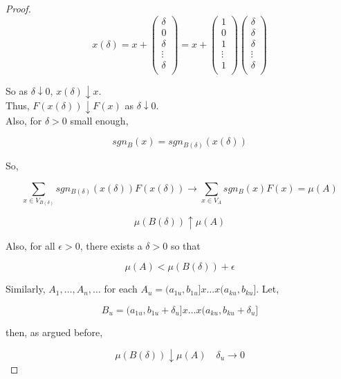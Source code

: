 \documentclass[11pt,fleqn]{book} %
\begin{document}
\begin{proof}
				$$x(\delta) = x + \begin{pmatrix}
					\delta\\
					0\\
					\delta\\
					\vdots \\
					\delta\\
				\end{pmatrix} = x + \begin{pmatrix}
					1\\
					0\\
					1\\
					\vdots \\
					1\\
				\end{pmatrix}   \begin{pmatrix}
					\delta\\
					\delta\\
					\delta\\
					\vdots \\
					\delta\\
				\end{pmatrix}$$

		So as $\delta \downarrow 0$, $x(\delta) \downarrow x$.\\ 

		Thus, $F(x(\delta)) \downarrow F(x)$ as $\delta \downarrow 0$.\\

		Also, for $\delta > 0$ small enough, 

				$$sgn_B(x) = sgn_{B(\delta)} (x(\delta)) $$

		So, 

				$$\sum_{x \in V_{B(\delta)}} sgn_{B(\delta)} (x(\delta)) F(x(\delta)) \rightarrow \sum_{x \in V_{A}} sgn_{B} (x) F(x) = \mu(A)$$

				$$\mu(B(\delta)) \uparrow \mu(A) $$

		Also, for all $\epsilon > 0$, there exists a $\delta > 0$ so that

				$$ \mu(A) < \mu(B(\delta)) + \epsilon $$

		Similarly, $A_1, \dots, A_n, \dots$ for each $A_u = (a_{1u}, b_{1u}] x \dots x (a_{ku}, b_{ku}]$. Let, 

				$$B_u = (a_{1u}, b_{1u} + \delta_u] x \dots x (a_{ku}, b_{ku} + \delta_u] $$

		then, as argued before, 

				$$ \mu(B(\delta)) \downarrow \mu(A) \quad \delta_u \rightarrow 0$$


\end{proof}
\end{document}
